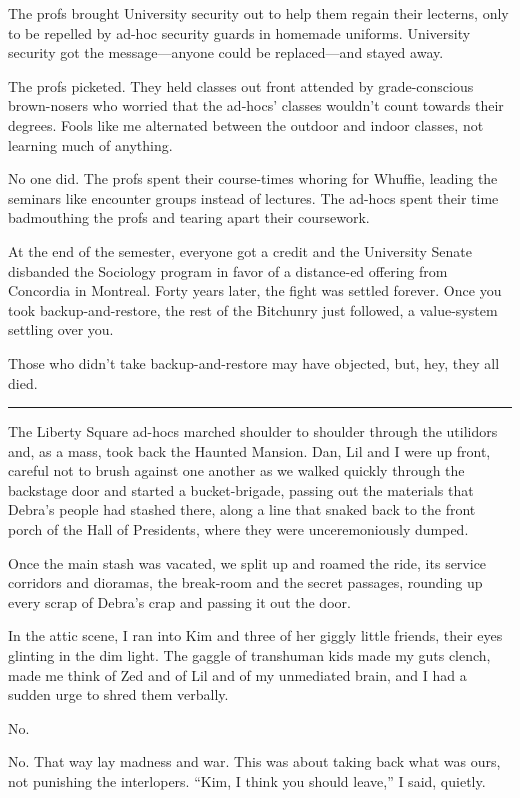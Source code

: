 The profs brought University security out to help them regain their
lecterns, only to be repelled by ad-hoc security guards in homemade
uniforms. University security got the message—anyone could be
replaced—and stayed away.

The profs picketed. They held classes out front attended by
grade-conscious brown-nosers who worried that the ad-hocs' classes
wouldn't count towards their degrees. Fools like me alternated
between the outdoor and indoor classes, not learning much of
anything.

No one did. The profs spent their course-times whoring for Whuffie,
leading the seminars like encounter groups instead of lectures. The
ad-hocs spent their time badmouthing the profs and tearing apart
their coursework.

At the end of the semester, everyone got a credit and the
University Senate disbanded the Sociology program in favor of a
distance-ed offering from Concordia in Montreal. Forty years later,
the fight was settled forever. Once you took backup-and-restore,
the rest of the Bitchunry just followed, a value-system settling
over you.

Those who didn't take backup-and-restore may have objected, but,
hey, they all died.

\begin{center}\rule{3in}{0.4pt}\end{center}

The Liberty Square ad-hocs marched shoulder to shoulder through the
utilidors and, as a mass, took back the Haunted Mansion. Dan, Lil
and I were up front, careful not to brush against one another as we
walked quickly through the backstage door and started a
bucket-brigade, passing out the materials that Debra's people had
stashed there, along a line that snaked back to the front porch of
the Hall of Presidents, where they were unceremoniously dumped.

Once the main stash was vacated, we split up and roamed the ride,
its service corridors and dioramas, the break-room and the secret
passages, rounding up every scrap of Debra's crap and passing it
out the door.

In the attic scene, I ran into Kim and three of her giggly little
friends, their eyes glinting in the dim light. The gaggle of
transhuman kids made my guts clench, made me think of Zed and of
Lil and of my unmediated brain, and I had a sudden urge to shred
them verbally.

No.

No. That way lay madness and war. This was about taking back what
was ours, not punishing the interlopers. “Kim, I think you should
leave,” I said, quietly.

